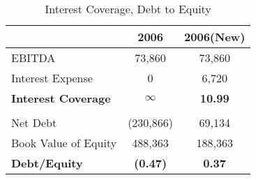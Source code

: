 \begin{table}[ht]
\centering
\begin{tabular}{lcc}
\toprule
                           & 2006            & 2006(New)      \\    \midrule
EBITDA                     & 73,860          & 73,860         \\
Interest Expense           & 0               & 6,720          \\
\textbf{Interest Coverage} & {$\mathbf\infty$}       & \textbf{10.99} \\
                           &                 &                \\
Net Debt                   & (230,866)       & 69,134         \\
Book Value of Equity       & 488,363         & 188,363        \\
\textbf{Debt/Equity}       & \textbf{(0.47)} & \textbf{0.37}  \\    \bottomrule
\end{tabular}
\caption{Interest Coverage, Debt to Equity}
\label{tab:q4-intcov_dtoe}
\end{table}
